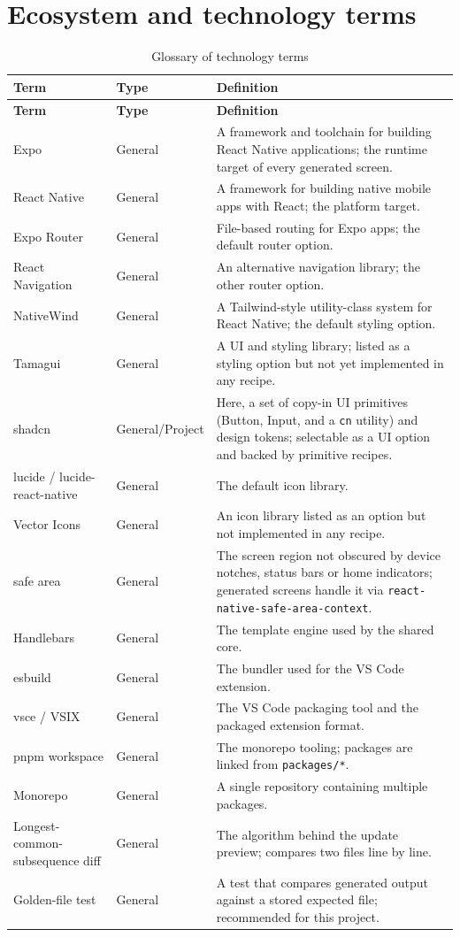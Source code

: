 \section{Ecosystem and technology terms}

\begin{longtable}{@{}L{3.8cm}L{1.6cm}L{8.8cm}@{}}
\caption{Glossary of technology terms}\\
\toprule
\textbf{Term} & \textbf{Type} & \textbf{Definition} \\
\midrule
\endfirsthead
\toprule
\textbf{Term} & \textbf{Type} & \textbf{Definition} \\
\midrule
\endhead
Expo & General & A framework and toolchain for building React Native applications;
the runtime target of every generated screen. \\
React Native & General & A framework for building native mobile apps with React;
the platform target. \\
Expo Router & General & File-based routing for Expo apps; the default router
option. \\
React Navigation & General & An alternative navigation library; the other router
option. \\
NativeWind & General & A Tailwind-style utility-class system for React Native; the
default styling option. \\
Tamagui & General & A UI and styling library; listed as a styling option but not
yet implemented in any recipe. \\
shadcn & General/Project & Here, a set of copy-in UI primitives (Button, Input,
and a \texttt{cn} utility) and design tokens; selectable as a UI option and
backed by primitive recipes. \\
lucide / lucide-react-native & General & The default icon library. \\
Vector Icons & General & An icon library listed as an option but not implemented in
any recipe. \\
safe area & General & The screen region not obscured by device notches, status
bars or home indicators; generated screens handle it via
\texttt{react-native-safe-area-context}. \\
Handlebars & General & The template engine used by the shared core. \\
esbuild & General & The bundler used for the VS Code extension. \\
vsce / VSIX & General & The VS Code packaging tool and the packaged extension
format. \\
pnpm workspace & General & The monorepo tooling; packages are linked from
\texttt{packages/*}. \\
Monorepo & General & A single repository containing multiple packages. \\
Longest-common-subsequence diff & General & The algorithm behind the update
preview; compares two files line by line. \\
Golden-file test & General & A test that compares generated output against a
stored expected file; recommended for this project. \\
\bottomrule
\end{longtable}

